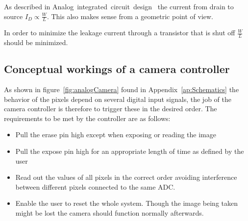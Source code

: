 As described in Analog~integrated~circuit~design~\cite{AnalogBook} the current from drain to source $I_D \propto \frac{W}{L}$.
This also makes sense from a geometric point of view.

In order to minimize the leakage current through a transistor that is shut off $\frac{W}{L}$ should be minimized.

\subsection{Conceptual workings of a camera controller}

As shown in figure~\ref{fig:analogCamera} found in Appendix~\ref{ap:Schematics} the behavior of the pixels depend on several digital input signals,
the job of the camera controller is therefore to trigger these in the desired order.
The requirements to be met by the controller are as follows:

\begin{itemize}
\item Pull the erase pin high except when exposing or reading the image
\item Pull the expose pin high for an appropriate length of time as defined by the user
\item Read out the values of all pixels in the correct order avoiding interference between different pixels connected to the same ADC.
\item Enable the user to reset the whole system. Though the image being taken might be lost the camera should function normally afterwards.
\end{itemize}

